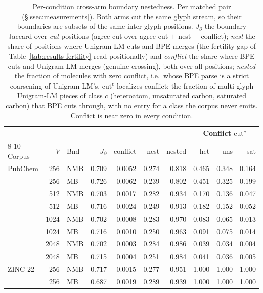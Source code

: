 \begin{table}[htbp]
  \centering
  \caption{Per-condition cross-arm boundary nestedness. Per matched pair (\S\ref{ssec:measurements}). Both arms cut the same glyph stream, so their boundaries are subsets of the same inter-glyph positions. $J_{\partial}$ the boundary Jaccard over \emph{cut} positions (agree-cut over agree-cut $+$ nest $+$ conflict); \emph{nest} the share of positions where Unigram-LM cuts and BPE merges (the fertility gap of Table~\ref{tab:results-fertility} read positionally) and \emph{conflict} the share where BPE cuts and Unigram-LM merges (genuine crossing), both over all positions; \emph{nested} the fraction of molecules with zero conflict, i.e.\ whose BPE parse is a strict coarsening of Unigram-LM's. $\mathrm{cut}^{c}$ localizes conflict: the fraction of multi-glyph Unigram-LM pieces of class $c$ (heteroatom, unsaturated carbon, saturated carbon) that BPE cuts through, with no entry for a class the corpus never emits. Conflict is near zero in every condition.}
  \label{tab:results-nestedness}
  \footnotesize
  \begin{tabular}{@{}l r l r r r r r r r@{}}
    \toprule
    & & & & & & & \multicolumn{3}{c}{Conflict $\mathrm{cut}^{c}$} \\
    \cmidrule(lr){8-10}
    Corpus & $V$ & Bnd & $J_{\partial}$ & conflict & nest & nested & het & uns & sat \\
    \midrule
    PubChem & 256 & NMB & 0.709 & 0.0052 & 0.274 & 0.818 & 0.465 & 0.348 & 0.164 \\
     & 256 & MB & 0.726 & 0.0062 & 0.239 & 0.802 & 0.451 & 0.325 & 0.199 \\
     & 512 & NMB & 0.703 & 0.0017 & 0.282 & 0.934 & 0.170 & 0.136 & 0.047 \\
     & 512 & MB & 0.716 & 0.0024 & 0.249 & 0.913 & 0.182 & 0.152 & 0.052 \\
     & 1024 & NMB & 0.702 & 0.0008 & 0.283 & 0.970 & 0.083 & 0.065 & 0.013 \\
     & 1024 & MB & 0.716 & 0.0010 & 0.250 & 0.963 & 0.091 & 0.075 & 0.014 \\
     & 2048 & NMB & 0.702 & 0.0003 & 0.284 & 0.986 & 0.039 & 0.034 & 0.004 \\
     & 2048 & MB & 0.715 & 0.0004 & 0.251 & 0.984 & 0.041 & 0.036 & 0.005 \\
    \addlinespace
    ZINC-22 & 256 & NMB & 0.717 & 0.0015 & 0.277 & 0.951 & 1.000 & 1.000 & 1.000 \\
     & 256 & MB & 0.687 & 0.0019 & 0.289 & 0.939 & 1.000 & 1.000 & 1.000 \\

\end{tabular}
\end{table}
